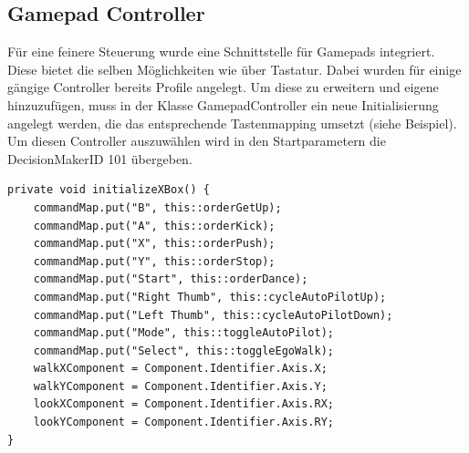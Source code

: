\subsection{Gamepad Controller}
Für eine feinere Steuerung wurde eine Schnittstelle für Gamepads integriert. Diese bietet die selben Möglichkeiten wie über Tastatur. Dabei wurden für einige gängige Controller bereits Profile angelegt. Um diese zu erweitern und eigene hinzuzufügen, muss in der Klasse GamepadController ein neue Initialisierung angelegt werden, die das entsprechende Tastenmapping umsetzt (siehe Beispiel).\\
Um diesen Controller auszuwählen wird in den Startparametern die DecisionMakerID 101 übergeben.

\begin{lstlisting}[caption=InitializeGamePad, captionpos=b, label=lst:Gamepad]
private void initializeXBox() {
    commandMap.put("B", this::orderGetUp);
    commandMap.put("A", this::orderKick);
    commandMap.put("X", this::orderPush);
    commandMap.put("Y", this::orderStop);
    commandMap.put("Start", this::orderDance);
    commandMap.put("Right Thumb", this::cycleAutoPilotUp);
    commandMap.put("Left Thumb", this::cycleAutoPilotDown);
    commandMap.put("Mode", this::toggleAutoPilot);
    commandMap.put("Select", this::toggleEgoWalk);
    walkXComponent = Component.Identifier.Axis.X;
    walkYComponent = Component.Identifier.Axis.Y;
    lookXComponent = Component.Identifier.Axis.RX;
    lookYComponent = Component.Identifier.Axis.RY;
}
\end{lstlisting}